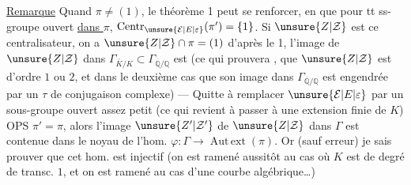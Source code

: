 \uline{Remarque} Quand $\pi\neq(1)$,  le théorème 1 peut se renforcer,  en  que pour tt ss-groupe  ouvert \uline{dans $\pi$}, $\operatorname{Centr}_{\unsure{\mathcal E|E|\varepsilon}}(\pi')=\{1\}$. Si $\unsure{Z|\mathcal Z}$ est ce centralisateur, on a $\unsure{Z|\mathcal Z}\cap\pi=(1)$ d'après le 1,  l'image de $\unsure{Z|\mathcal Z}$ dans $\Gamma_{\bar K/K}\subset\Gamma_{\overline{\mathbb Q}/\mathbb Q}$ est  (ce qui prouvera  , que $\unsure{Z|\mathcal Z}$ est d'ordre $1$ ou $2$, et dans le deuxième cas que son image dans $\Gamma_{\overline{\mathbb Q}/\mathbb Q}$ est  engendrée par un $\tau$ de conjugaison complexe) --- Quitte à remplacer $\unsure{\mathcal E|E|\varepsilon}$ par un sous-groupe ouvert assez petit (ce qui revient à passer à une extension finie de $K$) OPS $\pi'=\pi$, alors l'image $\unsure{Z'|\mathcal Z'}$ de $\unsure{Z|\mathcal Z}$ dans $\Gamma$ est contenue dans le noyau de l'hom. $\varphi:\Gamma\longrightarrow\operatorname{Aut\,ext}(\pi)$. Or (sauf erreur) je sais prouver que cet hom. est injectif (on est ramené aussitôt au cas où $K$ est de degré de transc. $1$, et on est ramené au cas  d'une courbe algébrique\ldots)
